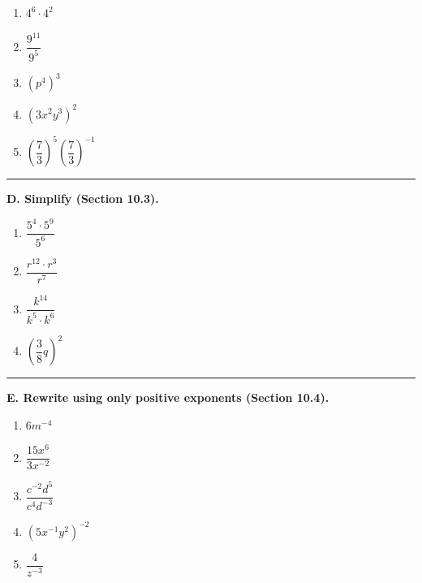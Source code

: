 \documentclass[11pt]{article}
\begin{document}
\begin{enumerate}[label=\arabic*., resume]
\item $4^6\cdot 4^2$

\item $\dfrac{9^{11}}{9^5}$

\item $(p^4)^3$

\item $(3x^2y^3)^2$

\item $\left(\dfrac{7}{3}\right)^5\left(\dfrac{7}{3}\right)^{-1}$
\end{enumerate}

\vspace{0.3em}
\hrule
\vspace{0.8em}

\textbf{D. Simplify (Section 10.3).}

\begin{enumerate}[label=\arabic*., resume]
\item $\dfrac{5^4\cdot 5^9}{5^6}$

\item $\dfrac{r^{12}\cdot r^3}{r^7}$

\item $\dfrac{k^{14}}{k^5\cdot k^6}$

\item $\left(\dfrac{3}{8}q\right)^2$
\end{enumerate}

\vspace{0.3em}
\hrule
\vspace{0.8em}

\textbf{E. Rewrite using only positive exponents (Section 10.4).}

\begin{enumerate}[label=\arabic*., resume]
\item $6m^{-4}$

\item $\dfrac{15x^6}{3x^{-2}}$

\item $\dfrac{c^{-2}d^5}{c^4d^{-3}}$

\item $(5x^{-1}y^2)^{-2}$

\item $\dfrac{4}{z^{-3}}$
\end{enumerate}
\end{document}
